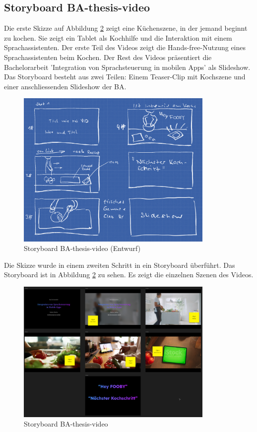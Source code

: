 \documentclass[main.tex]{subfiles} %
\begin{document}
\subsection{Storyboard BA-thesis-video}
Die erste Skizze auf Abbildung \ref{fig:storyboard} zeigt eine Küchenszene, in der jemand beginnt 
zu kochen. Sie zeigt ein Tablet als Kochhilfe und die Interaktion mit einem Sprachassistenten. 
Der erste Teil des Videos zeigt die Hands-free-Nutzung eines Sprachassistenten beim Kochen. 
Der Rest des Videos präsentiert die Bachelorarbeit 'Integration von Sprachsteuerung in mobilen Apps' 
als Slideshow. Das Storyboard besteht aus zwei Teilen: Einem Teaser-Clip mit Kochszene und einer 
anschliessenden Slideshow der BA.

\begin{figure}[H]
    \centering
    \includegraphics[width=0.85\textwidth]{img/storyboard-draft.png}
    \caption{Storyboard BA-thesis-video (Entwurf)}
    \label{fig:storyboard-draft}
\end{figure}

\noindent \newline
Die Skizze wurde in einem zweiten Schritt in ein Storyboard überführt. Das Storyboard ist in 
Abbildung \ref{fig:storyboard} zu sehen. Es zeigt die einzelnen Szenen des Videos.

\begin{figure}[H]
    \centering
    \includegraphics[width=0.85\textwidth]{img/storyboard.png}
    \caption{Storyboard BA-thesis-video}
    \label{fig:storyboard}
\end{figure}
\end{document}
